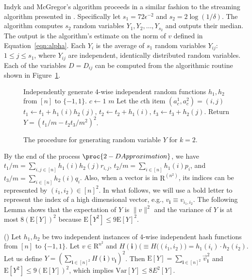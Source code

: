 \def\draft{0}  \documentclass[proceedings]{stacs}
\theoremstyle{plain}\newtheorem{satz}[thm]{Satz}
\theoremstyle{definition}\newtheorem{crucial}[thm]{Crucial Definition}
\begin{document}
Indyk and McGregor's algorithm proceeds in a similar fashion
to the streaming algorithm presented in \cite{ams}. Specifically let $s_1 = 72\epsilon^{-2}$ and $s_2 = 2\log (1/\delta)$.
The algorithm computes $s_2$ random variables $Y_1, Y_2, \dots, Y_{s_2}$ and
outputs their median. The output is the algorithm's estimate on the norm of $v$ defined in Equation~\ref{eqn:alpha}.
Each $Y_i$ is the average of $s_1$ random variables $Y_{ij}$: $1 \leq j \leq s_1$, where $Y_{ij}$ are independent, identically
distributed random variables. Each of the variables $D = D_{ij}$ can be computed from the algorithmic routine shown in
Figure~\ref{fig:algx}.


\begin{figure}[htp]
\begin{codebox}
\li Independently generate 4-wise independent random functions $h_1, h_2$ from $[n]$ to $\{-1, 1\}$.
\li \For $c \gets 1$ \To $m$
\li \Do Let the $c$th item $(a^1_c, a^2_c) = (i, j)$
\li $t_1 \gets t_1 + h_1(i)h_2(j)$, $t_2 \gets t_2 + h_1(i)$, $t_3 \gets t_3 + h_2(j)$.
\End
\li Return $Y = (t_1 / m - t_2t_3 / m^2)^2$.
\end{codebox}
\caption{ The procedure for generating random variable $Y$ for $k=2$.}
\label{fig:algx}
\end{figure}

\noindent
By the end of the process $\proc{2-D Approximation}$, we have 
$t_1 / m = \sum_{i, j \in [n]}h_1(i)h_2(j)r_{i,j}$,
$t_2 / m = \sum_{i \in [n]}h_1(i)p_i$, and $t_3 / m = \sum_{i \in [n]}h_2(i)q_i$. Also, when a vector is in ${\mathrm R}^{(n^2)}$, its indices can be represented by $(i_1, i_2) \in [n]^2$. In what follows, we will use a bold letter to represent the index of a high dimensional vector, e.g., $v_{\mathbf i} \equiv v_{i_1, i_2}$.
The following Lemma shows that the expectation of $Y$ is $\|v\|^2$ and the variance of $Y$ is at most $8(\mathrm E[Y])^2$ because $\mathrm E[Y^2] \leq 9 \mathrm E[Y]^2$.

\begin{lemma}\label{lem:varx}(\cite{IM08}) Let $h_1, h_2$ be two independent instances of 4-wise independent hash functions from $[n]$ to $\{-1, 1\}$. Let $v \in \mathrm R^{n^2}$ and $H(\mathbf i)(\equiv H\big((i_1, i_2)\big) = h_1(i_i)\cdot h_2(i_2)$. Let us define $Y = \left(\sum_{\mathbf i \in [n]^2}H(\mathbf i)v_{\mathbf i}\right)^2$. Then
$\mathrm E[Y] = \sum_{\mathbf i \in [n]^2}\vec v_{\mathbf i}^2$ and $\mathrm E[Y^2] \leq 9(\mathrm E[Y])^2$, which implies $\mathrm{Var}[Y] \leq 8 E^2[Y]$.
\end{lemma}
\end{document}
